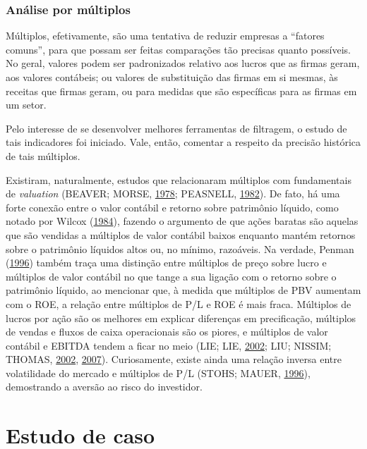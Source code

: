 \documentclass[grad,numbers]{coppe}
\begin{document}
  \hypertarget{anuxe1lise-por-muxfaltiplos}{%
  \subsection{Análise por múltiplos}\label{anuxe1lise-por-muxfaltiplos}}

  Múltiplos, efetivamente, são uma tentativa de reduzir empresas a ``fatores comuns'', para que possam ser feitas comparações tão precisas quanto possíveis. No geral, valores podem ser padronizados relativo aos lucros que as firmas geram, aos valores contábeis; ou valores de substituição das firmas em si mesmas, às receitas que firmas geram, ou para medidas que são específicas para as firmas em um setor.

  Pelo interesse de se desenvolver melhores ferramentas de filtragem, o estudo de tais indicadores foi iniciado. Vale, então, comentar a respeito da precisão histórica de tais múltiplos.

  Existiram, naturalmente, estudos que relacionaram múltiplos com fundamentais de \emph{valuation} (BEAVER; MORSE, \protect\hyperlink{ref-beaver1978}{1978}; PEASNELL, \protect\hyperlink{ref-peasnell1982}{1982}). De fato, há uma forte conexão entre o valor contábil e retorno sobre patrimônio líquido, como notado por Wilcox (\protect\hyperlink{ref-wilcox1984}{1984}), fazendo o argumento de que ações baratas são aquelas que são vendidas a múltiplos de valor contábil baixos enquanto mantém retornos sobre o patrimônio líquidos altos ou, no mínimo, razoáveis. Na verdade, Penman (\protect\hyperlink{ref-penman1996}{1996}) também traça uma distinção entre múltiplos de preço sobre lucro e múltiplos de valor contábil no que tange a sua ligação com o retorno sobre o patrimônio líquido, ao mencionar que, à medida que múltiplos de PBV aumentam com o ROE, a relação entre múltiplos de P/L e ROE é mais fraca. Múltiplos de lucros por ação são os melhores em explicar diferenças em precificação, múltiplos de vendas e fluxos de caixa operacionais são os piores, e múltiplos de valor contábil e EBITDA tendem a ficar no meio (LIE; LIE, \protect\hyperlink{ref-lie2002}{2002}; LIU; NISSIM; THOMAS, \protect\hyperlink{ref-liu2002}{2002}, \protect\hyperlink{ref-liu2007}{2007}). Curiosamente, existe ainda uma relação inversa entre volatilidade do mercado e múltiplos de P/L (STOHS; MAUER, \protect\hyperlink{ref-stohs1996}{1996}), demostrando a aversão ao risco do investidor.

  \hypertarget{estudo-de-caso}{%
  \chapter{Estudo de caso}\label{estudo-de-caso}}
\end{document}

